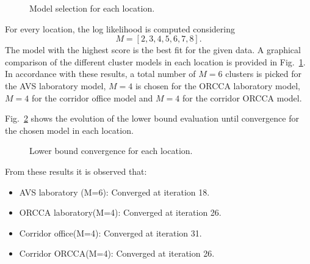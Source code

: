 \begin{figure}[!h]
	\centering
	\caption{Model selection for each location.}
	\label{fig:ModelSelection}
\end{figure}

For every location, the log likelihood is computed considering 
$$M = [2, 3, 4, 5, 6, 7, 8].$$ The model with the highest score is the best fit for the given data. 
A graphical comparison of the different cluster models in each location is provided in Fig.~\ref{fig:ModelSelection}. 
In accordance with these results, %
a total number of $M = 6$ clusters is picked for the AVS laboratory model, 
$M = 4$ is chosen for the ORCCA laboratory model, 
$M = 4$ for the corridor office model and 
$M = 4$ for the corridor ORCCA model.

Fig.~\ref{fig:LowerBound} shows the evolution of the lower bound evaluation until convergence for the 
chosen model in each location. 

\begin{figure}[!h]
	\centering
	\caption{Lower bound convergence for each location.}
	\label{fig:LowerBound}
\end{figure}

From these results it is observed that: 
\begin{itemize}
	\item{AVS laboratory (M=6): }
	Converged at iteration 18.
	\item{ORCCA laboratory(M=4): }
	Converged at iteration 26.
	\item{Corridor office(M=4): }
	Converged at iteration 31.
	\item{Corridor ORCCA(M=4): }
	Converged at iteration 26.
\end{itemize}

